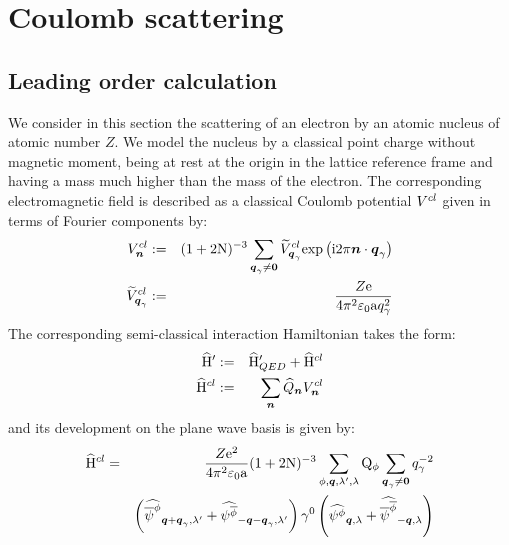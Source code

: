 \documentclass[10pt,a4paper,twoside,openany]{book}
\begin{document}
\chapter{Coulomb scattering}
\label{Coulomb scattering}

\section{Leading order calculation}

We consider in this section the scattering of an electron by an atomic nucleus of atomic number $Z$. We model the nucleus by a classical point charge without magnetic moment, being at rest at the origin in the lattice reference frame and having a mass much higher than the mass of the electron. The corresponding electromagnetic field is described as a classical Coulomb potential $V^{cl}$ given in terms of Fourier components by:
\begin{eqnarray*}
V^{cl}_{\boldsymbol{n}} & := & ( 1 + 2 \mathrm N )^{-3} \sum_{\boldsymbol{q}_\gamma \neq \boldsymbol{0}} \widetilde{V}^{cl}_{\boldsymbol{q}_\gamma} \mathrm{exp} \left( {\mathrm{i} 2 \pi \boldsymbol{n} \cdot \boldsymbol{q}_\gamma} \right) \\
\widetilde{V}^{cl}_{\boldsymbol{q}_\gamma} & := & \frac{Z \mathrm e}{4 \pi^2 \mathrm \varepsilon_0 \mathrm a q_\gamma^2}
\end{eqnarray*}
The corresponding semi-classical interaction Hamiltonian takes the form:
\begin{eqnarray*}
\widehat{\mathrm H}' & := & \widehat{\mathrm H}'_{QED} + \widehat{\mathrm H}^{cl} \\
\widehat{\mathrm H}^{cl} & := & \sum_{\boldsymbol{n}} \widehat{Q}_{\boldsymbol{n}} V^{cl}_{\boldsymbol{n}}
\end{eqnarray*}
and its development on the plane wave basis is given by:
\begin{eqnarray*}
\widehat{\mathrm H}^{cl} & = & \frac{Z \mathrm e^2}{4 \pi^2 \mathrm \varepsilon_0 \mathrm a} ( 1 + 2 \mathrm N )^{-3} \sum_{\phi, \boldsymbol{q}, \lambda', \lambda} \mathrm Q_{\phi} \sum_{\boldsymbol{q}_\gamma \neq \boldsymbol{0}} q_\gamma^{-2} \\
&& \left( \widehat{\overline \psi^{\phi}}_{{\boldsymbol{q} + \boldsymbol{q}_\gamma}, {\lambda'}} + \widehat{\psi^{\overline{\phi}}}_{{-\boldsymbol{q} - \boldsymbol{q}_\gamma}, {\lambda'}} \right) \gamma^{0} \left( \widehat{\psi^{\phi}}_{{\boldsymbol{q}}, {\lambda}} + \widehat{\overline \psi^{\overline{\phi}}}_{{-\boldsymbol{q}}, {\lambda}} \right)
\end{eqnarray*}
\end{document}
